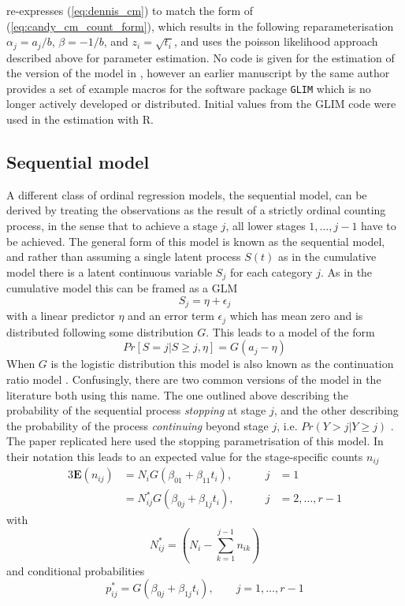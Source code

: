 \citet{candy1991modeling} re-expresses (\ref{eq:dennis_cm}) to match the form of (\ref{eq:candy_cm_count_form}), which results in the following re\-para\-meter\-isation $\alpha_j = a_j/b$, $\beta = -1/b$, and $z_i = \sqrt{t_i}$, and uses the poisson likelihood approach described above for parameter estimation. No code is given for the estimation of the version of the model in \citep{candy1991modeling}, however an earlier manuscript by the same author \citep{candy1990biology} provides a set of example macros for the software package \verb+GLIM+ \citep{aitkin1989statistical} which is no longer actively developed or distributed. Initial values from the GLIM code were used in the estimation with R.

\subsection{Sequential model}
A different class of ordinal regression models, the sequential model, can be derived by treating the observations as the result of a strictly ordinal counting process, in the sense that to achieve a stage $j$, all lower stages $1,\dots,j-1$ have to be achieved. The general form of this model is known as the sequential model, and rather than assuming a single latent process $S(t)$ as in the cumulative model there is a latent continuous variable $S_j$ for each category $j$. As in the cumulative model this can be framed as a GLM 
\begin{equation}
S_j = \eta + \epsilon_j
\end{equation}
with a linear predictor $\eta$ and an error term $\epsilon_j$ which has mean zero and is distributed following some distribution $G$. This leads to a model of the form 
\begin{equation}
Pr[S = j|S \geq j, \eta] = G(a_j - \eta)
\end{equation}
When $G$ is the logistic distribution this model is also known as the continuation ratio model \citep{fienberg1980analysis}. Confusingly, there are two common versions of the model in the literature both using this name. The one outlined above describing the probability of the sequential process \emph{stopping} at stage $j$, and the other describing the probability of the process \emph{continuing} beyond stage $j$, i.e. $Pr(Y > j | Y \geq j)$ \citep{burkner2019ordinal,VGAM}. The paper replicated here \citep{candy1991modeling}  used the stopping parametrisation of this model.
In their notation this leads to an expected value for the stage-specific counts $n_{ij}$
\begin{alignat}{3}
\mathbf{E}(n_{ij})&=N_i G(\beta_{01} + \beta_{11}t_i), &j&=1 \label{eq:candy_sm_counts}\\
&=N^*_{ij} G(\beta_{0j} + \beta_{1j}t_i), \qquad &j&=2,\dots,r-1 \nonumber
\end{alignat}
with 
$$N^*_{ij}=\left(N_i - \sum_{k=1}^{j-1}n_{ik}\right) $$
and conditional probabilities 
\begin{equation}
p^*_{ij} =  G(\beta_{0j} + \beta_{1j}t_i), \qquad j=1,\dots,r-1
\end{equation}

